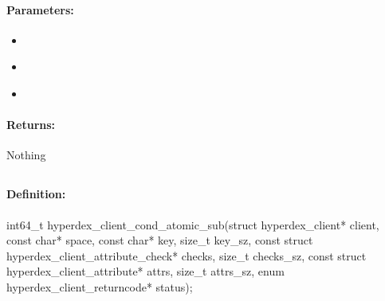 \paragraph{Parameters:}
\begin{itemize}[noitemsep]
\item {}\\

\item {}\\

\item {}\\

\end{itemize}

\paragraph{Returns:}
Nothing
\pagebreak
\subsection{}
\label{api:c:cond_atomic_sub}


\paragraph{Definition:}
\begin{ccode}
int64_t hyperdex_client_cond_atomic_sub(struct hyperdex_client* client,
        const char* space,
        const char* key, size_t key_sz,
        const struct hyperdex_client_attribute_check* checks, size_t checks_sz,
        const struct hyperdex_client_attribute* attrs, size_t attrs_sz,
        enum hyperdex_client_returncode* status);
\end{ccode}

